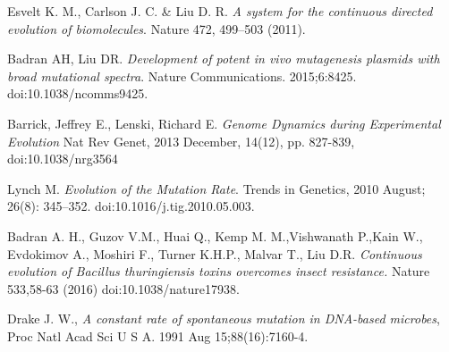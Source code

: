 \documentclass[10pt,letterpaper]{article}
\begin{document}
\nolinenumbers

\begin{thebibliography}{10}

Esvelt K. M., Carlson J. C. \& Liu D. R.
\newblock \textit{A system for the continuous directed evolution of biomolecules}.
\newblock Nature 472, 499–503 (2011).

Badran AH, Liu DR.
\newblock \textit{{D}evelopment of potent in vivo mutagenesis plasmids with broad mutational spectra}.
\newblock Nature Communications. 2015;6:8425. doi:10.1038/ncomms9425.

Barrick, Jeffrey E., Lenski, Richard E.
\newblock \textit{{G}enome Dynamics during Experimental Evolution}
\newblock  Nat Rev Genet, 2013 December, 14(12), pp. 827-839, doi:10.1038/nrg3564

Lynch M.
\newblock \textit{{E}volution of the Mutation Rate}.
\newblock Trends in Genetics, 2010 August; 26(8): 345–352. doi:10.1016/j.tig.2010.05.003.

  Badran A. H., Guzov V.M., Huai Q., Kemp M. M.,Vishwanath P.,Kain W., Evdokimov A., Moshiri F., Turner K.H.P., Malvar T., Liu D.R.
  \newblock \textit{{C}ontinuous evolution of Bacillus thuringiensis toxins overcomes insect resistance.}
  \newblock  Nature 533,58-63 (2016) doi:10.1038/nature17938.

  Drake J. W., 
  \newblock \textit{{A} constant rate of spontaneous mutation in DNA-based microbes}, 
  \newblock  Proc Natl Acad Sci U S A. 1991 Aug 15;88(16):7160-4.
\end{thebibliography}

\end{document}
